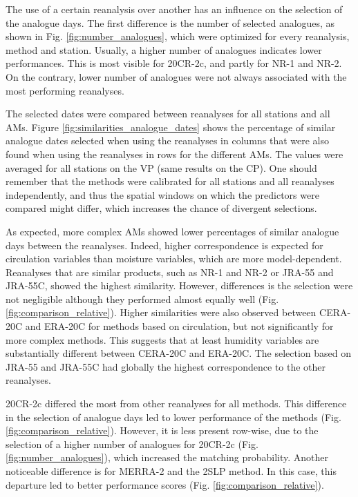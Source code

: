 \documentclass{ametsoc}
\begin{document}
The use of a certain reanalysis over another has an influence on the selection of the analogue days. The first difference is the number of selected analogues, as shown in Fig. \ref{fig:number_analogues}, which were optimized for every reanalysis, method and station. Usually, a higher number of analogues indicates lower performances. This is most visible for 20CR-2c, and partly for NR-1 and NR-2. On the contrary, lower number of analogues were not always associated with the most performing reanalyses.

The selected dates were compared between reanalyses for all stations and all AMs. Figure \ref{fig:similarities_analogue_dates} shows the percentage of similar analogue dates selected when using the reanalyses in columns that were also found when using the reanalyses in rows for the different AMs. The values were averaged for all stations on the VP (same results on the CP). One should remember that the methods were calibrated for all stations and all reanalyses independently, and thus the spatial windows on which the predictors were compared might differ, which increases the chance of divergent selections.

As expected, more complex AMs showed lower percentages of similar analogue days between the reanalyses. Indeed, higher correspondence is expected for circulation variables than moisture variables, which are more model-dependent. Reanalyses that are similar products, such as NR-1 and NR-2 or JRA-55 and JRA-55C, showed the highest similarity. However, differences is the selection were not negligible although they performed almost equally well (Fig. \ref{fig:comparison_relative}). Higher similarities were also observed between CERA-20C and ERA-20C for methods based on circulation, but not significantly for more complex methods. This suggests that at least humidity variables are substantially different between CERA-20C and ERA-20C. The selection based on JRA-55 and JRA-55C had globally the highest correspondence to the other reanalyses.

20CR-2c differed the most from other reanalyses for all methods. This difference in the selection of analogue days led to lower performance of the methods (Fig. \ref{fig:comparison_relative}). However, it is less present row-wise, due to the selection of a higher number of analogues for 20CR-2c (Fig. \ref{fig:number_analogues}), which increased the matching probability. Another noticeable difference is for MERRA-2 and the 2SLP method. In this case, this departure led to better performance scores (Fig. \ref{fig:comparison_relative}).
\end{document}
